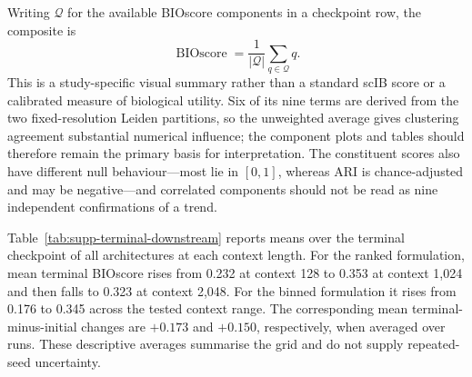 \documentclass[11pt]{article}
\begin{document}
Writing \(\mathcal{Q}\) for the available BIOscore components in a checkpoint row, the composite is
\begin{equation}
\operatorname{BIOscore}=\frac{1}{|\mathcal{Q}|}\sum_{q\in\mathcal{Q}}q.
\end{equation}
This is a study-specific visual summary rather than a standard scIB score or a calibrated measure of biological utility.
Six of its nine terms are derived from the two fixed-resolution Leiden partitions, so the unweighted average gives clustering agreement substantial numerical influence; the component plots and tables should therefore remain the primary basis for interpretation.
The constituent scores also have different null behaviour---most lie in \([0,1]\), whereas ARI is chance-adjusted and may be negative---and correlated components should not be read as nine independent confirmations of a trend.

Table~\ref{tab:supp-terminal-downstream} reports means over the terminal checkpoint of all architectures at each context length.
For the ranked formulation, mean terminal BIOscore rises from 0.232 at context 128 to 0.353 at context 1,024 and then falls to 0.323 at context 2,048.
For the binned formulation it rises from 0.176 to 0.345 across the tested context range.
The corresponding mean terminal-minus-initial changes are $+0.173$ and $+0.150$, respectively, when averaged over runs.
These descriptive averages summarise the grid and do not supply repeated-seed uncertainty.
\end{document}
